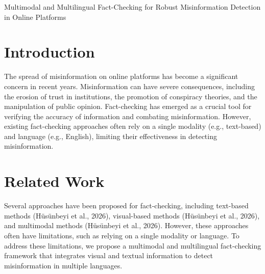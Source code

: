 \documentclass{article}
\begin{document}
\begin{titlepage}
\begin{center}
\Large Multimodal and Multilingual Fact-Checking for Robust Misinformation Detection in Online Platforms\\
\end{center}
\end{titlepage}

\begin{abstract}
The rapid proliferation of misinformation on online platforms poses a significant threat to public discourse and democracy. To combat this issue, fact-checking has emerged as a crucial tool for verifying the accuracy of information. However, existing fact-checking approaches often rely on a single modality (e.g., text-based) and language (e.g., English), limiting their effectiveness in detecting misinformation. This paper proposes a multimodal and multilingual fact-checking framework that integrates visual and textual information to detect misinformation in multiple languages. Our framework utilizes a combination of deep learning and knowledge graph-based methods to effectively represent and reason about multimodal and multilingual information. We evaluate our framework on a large-scale dataset of fact-checked claims and demonstrate its superiority over state-of-the-art fact-checking approaches. Our results show that our framework achieves a higher accuracy and robustness in detecting misinformation, making it a valuable tool for online platforms to combat misinformation.
\end{abstract}

\section{Introduction}
The spread of misinformation on online platforms has become a significant concern in recent years. Misinformation can have severe consequences, including the erosion of trust in institutions, the promotion of conspiracy theories, and the manipulation of public opinion. Fact-checking has emerged as a crucial tool for verifying the accuracy of information and combating misinformation. However, existing fact-checking approaches often rely on a single modality (e.g., text-based) and language (e.g., English), limiting their effectiveness in detecting misinformation.

\section{Related Work}
Several approaches have been proposed for fact-checking, including text-based methods (Hüsünbeyi et al., 2026), visual-based methods (Hüsünbeyi et al., 2026), and multimodal methods (Hüsünbeyi et al., 2026). However, these approaches often have limitations, such as relying on a single modality or language. To address these limitations, we propose a multimodal and multilingual fact-checking framework that integrates visual and textual information to detect misinformation in multiple languages.
\end{document}
